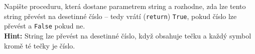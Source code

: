\question[70]
Napište proceduru, která dostane parametrem string a rozhodne, zda lze tento
string převést na desetinné číslo -- tedy vrátí (\texttt{return}) \texttt{True},
pokud číslo lze převést a \texttt{False} pokud ne.\\
\textbf{Hint:} String lze převést na desetinné číslo, když obsahuje tečku a
každý symbol kromě té tečky je číslo.